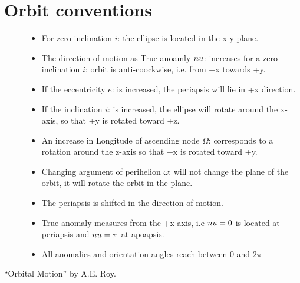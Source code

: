 \documentclass[letterpaper,10pt,english]{sphinxmanual}
\begin{document}
\section{Orbit conventions}
\label{\detokenize{introduction/conventions:orbit-conventions}}\begin{description}
\item[{}] \leavevmode\begin{itemize}
\item {} 
For zero inclination \(i\): the ellipse is located in the x-y plane.

\item {} 
The direction of motion as True anoamly \(\\nu\): increases for a zero inclination \(i\): orbit is anti-coockwise, i.e. from +x towards +y.

\item {} 
If the eccentricity \(e\): is increased, the periapsis will lie in +x direction.

\item {} 
If the inclination \(i\): is increased, the ellipse will rotate around the x-axis, so that +y is rotated toward +z.

\item {} 
An increase in Longitude of ascending node \(\Omega\): corresponds to a rotation around the z-axis so that +x is rotated toward +y.

\item {} 
Changing argument of perihelion \(\omega\): will not change the plane of the orbit, it will rotate the orbit in the plane.

\item {} 
The periapsis is shifted in the direction of motion.

\item {} 
True anomaly measures from the +x axis, i.e \(\\nu = 0\) is located at periapsis and \(\\nu = \pi\) at apoapsis.

\item {} 
All anomalies and orientation angles reach between 0 and \(2\pi\)

\end{itemize}

\end{description}

 “Orbital Motion” by A.E. Roy.
\end{document}
